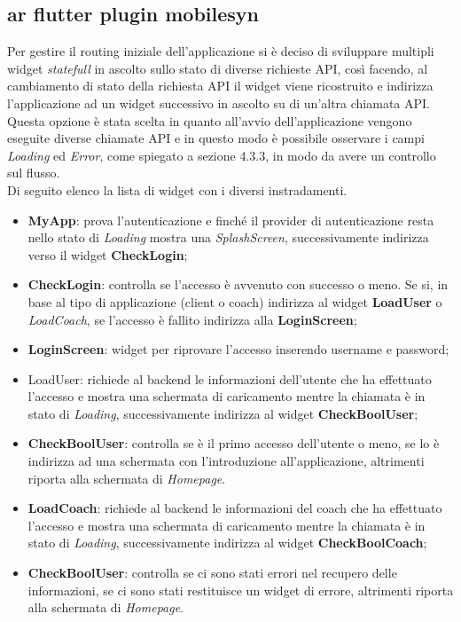 \subsection{ar flutter plugin mobilesyn}
Per gestire il routing iniziale dell'applicazione si è deciso di sviluppare multipli widget \textit{statefull} in ascolto sullo stato di diverse richieste API, così facendo, al cambiamento di stato della richiesta API il widget viene ricostruito e indirizza l'applicazione ad un widget successivo in ascolto su di un'altra chiamata API. Questa opzione è stata scelta in quanto all'avvio dell'applicazione vengono eseguite diverse chiamate API e in questo modo è possibile osservare i campi \textit{Loading} ed \textit{Error}, come spiegato a sezione 4.3.3, in modo da avere un controllo sul flusso.\\
Di seguito elenco la lista di widget con i diversi instradamenti.\\
\begin{itemize}
    \item \textbf{MyApp}: prova l'autenticazione e finché il provider di autenticazione resta nello stato di \textit{Loading} mostra una \textit{SplashScreen}, successivamente indirizza verso il widget \textbf{CheckLogin};
    \item \textbf{CheckLogin}: controlla se l'accesso è avvenuto con successo o meno. Se si, in base al tipo di applicazione (client o coach) indirizza al widget \textbf{LoadUser} o \textit{LoadCoach}, se l'accesso è fallito indirizza alla \textbf{LoginScreen};
    \item \textbf{LoginScreen}: widget per riprovare l'accesso inserendo username e password;
    \item LoadUser: richiede al backend le informazioni dell'utente che ha effettuato l'accesso e mostra una schermata di caricamento mentre la chiamata è in stato di \textit{Loading}, successivamente indirizza al widget \textbf{CheckBoolUser};
    \item \textbf{CheckBoolUser}: controlla se è il primo accesso dell'utente o meno, se lo è indirizza ad una schermata con l'introduzione all'applicazione, altrimenti riporta alla schermata di \textit{Homepage}.
    \item \textbf{LoadCoach}: richiede al backend le informazioni del coach che ha effettuato l'accesso e mostra una schermata di caricamento mentre la chiamata è in stato di \textit{Loading}, successivamente indirizza al widget \textbf{CheckBoolCoach};
    \item \textbf{CheckBoolUser}: controlla se ci sono stati errori nel recupero delle informazioni, se ci sono stati restituisce un widget di errore, altrimenti riporta alla schermata di \textit{Homepage}.
\end{itemize}

